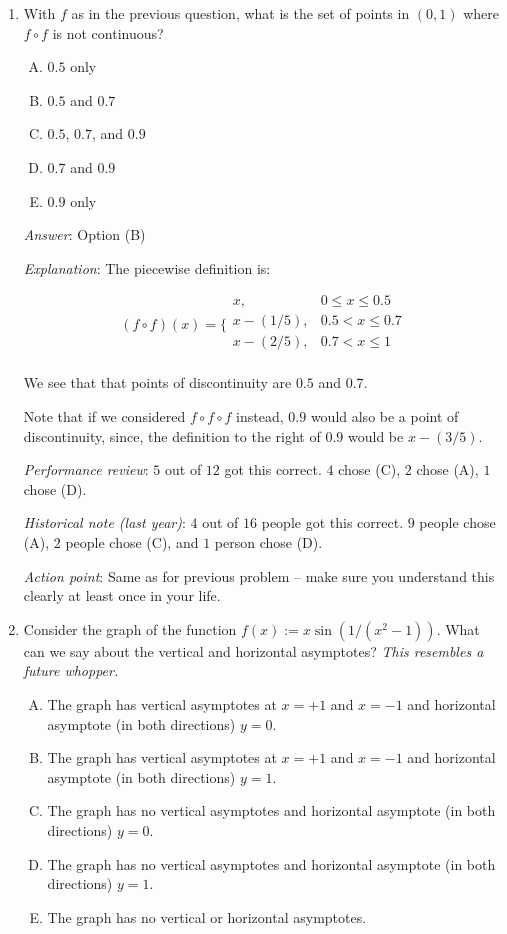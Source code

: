 \documentclass[10pt]{amsart}
\begin{document}
\begin{enumerate}
\item With $f$ as in the previous question, what is the set of points
  in $(0,1)$ where $f \circ f$ is not continuous?

  \begin{enumerate}[(A)]
  \item $0.5$ only
  \item $0.5$ and $0.7$
  \item $0.5$, $0.7$, and $0.9$
  \item $0.7$ and $0.9$
  \item $0.9$ only
  \end{enumerate}

  {\em Answer}: Option (B)

  {\em Explanation}: The piecewise definition is:

  $$(f \circ f)(x) = \lbrace\begin{array}{rl} x, & 0 \le x \le 0.5\\ x - (1/5), & 0.5 < x \le 0.7 \\ x - (2/5), & 0.7 < x \le 1 \\\end{array}$$

  We see that that points of discontinuity are $0.5$ and $0.7$.

  Note that if we considered $f \circ f \circ f$ instead, $0.9$ would
  also be a point of discontinuity, since, the definition to the right
  of $0.9$ would be $x - (3/5)$.
  
  {\em Performance review}: $5$ out of $12$ got this correct. $4$
  chose (C), $2$ chose (A), $1$ chose (D).

  {\em Historical note (last year)}: $4$ out of $16$ people got this
  correct. $9$ people chose (A), $2$ people chose (C), and $1$ person
  chose (D).

  {\em Action point}: Same as for previous problem -- make sure you
  understand this clearly at least once in your life.
\item Consider the graph of the function $f(x) := x\sin(1/(x^2 -
  1))$. What can we say about the vertical and horizontal asymptotes?
  {\em This resembles a future whopper.}

  \begin{enumerate}[(A)]
  \item The graph has vertical asymptotes at $x = +1$ and $x = -1$
    and horizontal asymptote (in both directions) $y = 0$.
  \item The graph has vertical asymptotes at $x = +1$ and $x = -1$
    and horizontal asymptote (in both directions) $y = 1$.
  \item The graph has no vertical asymptotes and horizontal
    asymptote (in both directions) $y = 0$.
  \item The graph has no vertical asymptotes and horizontal
    asymptote (in both directions) $y = 1$.
  \item The graph has no vertical or horizontal asymptotes.
  \end{enumerate}


\end{enumerate}
\end{document}
